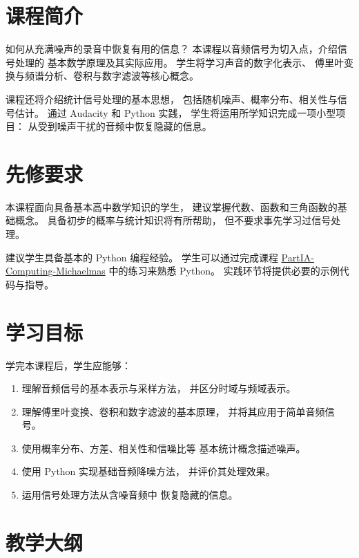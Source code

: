 \documentclass[12pt,fontset=none]{ctexart}
\begin{document}
\section{课程简介}

如何从充满噪声的录音中恢复有用的信息？
本课程以音频信号为切入点，介绍信号处理的
基本数学原理及其实际应用。
学生将学习声音的数字化表示、
傅里叶变换与频谱分析、卷积与数字滤波等核心概念。

课程还将介绍统计信号处理的基本思想，
包括随机噪声、概率分布、相关性与信号估计。
通过 Audacity 和 Python 实践，
学生将运用所学知识完成一项小型项目：
从受到噪声干扰的音频中恢复隐藏的信息。

\section{先修要求}

本课程面向具备基本高中数学知识的学生，
建议掌握代数、函数和三角函数的基础概念。
具备初步的概率与统计知识将有所帮助，
但不要求事先学习过信号处理。

建议学生具备基本的 Python 编程经验。
学生可以通过完成课程 \href{https://github.com/CambridgeEngineering/PartIA-Computing-Michaelmas}{PartIA-Computing-Michaelmas} 中的练习来熟悉 Python。
实践环节将提供必要的示例代码与指导。

\section{学习目标}

学完本课程后，学生应能够：

\begin{enumerate}
  \item 理解音频信号的基本表示与采样方法，
  并区分时域与频域表示。

  \item 理解傅里叶变换、卷积和数字滤波的基本原理，
  并将其应用于简单音频信号。

  \item 使用概率分布、方差、相关性和信噪比等
  基本统计概念描述噪声。

  \item 使用 Python 实现基础音频降噪方法，
  并评价其处理效果。

  \item 运用信号处理方法从含噪音频中
  恢复隐藏的信息。
\end{enumerate}

\section{教学大纲}
\end{document}
